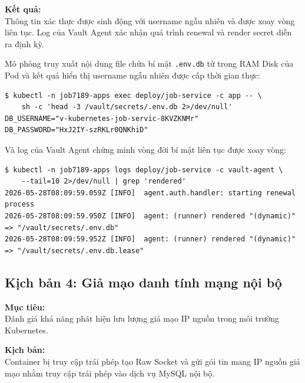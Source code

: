 \textbf{Kết quả:}\\
Thông tin xác thực được sinh động với username ngẫu nhiên và được xoay vòng liên tục. Log của Vault Agent xác nhận quá trình renewal và render secret diễn ra định kỳ.


Mô phỏng truy xuất nội dung file chứa bí mật \texttt{.env.db} từ trong RAM Disk của Pod và kết quả hiển thị username ngẫu nhiên được cấp thời gian thực:
\begin{listing}[H]
\begin{verbatim}
$ kubectl -n job7189-apps exec deploy/job-service -c app -- \
    sh -c 'head -3 /vault/secrets/.env.db 2>/dev/null'
DB_USERNAME="v-kubernetes-job-servic-8KVZKNMr"
DB_PASSWORD="HxJ2IY-szRKLr0QNKhiD"
\end{verbatim}
\caption{Đọc file mật khẩu được sinh động}
\label{lst:kb3_vault_jit_cmd}
\end{listing}

Và log của Vault Agent chứng minh vòng đời bí mật liên tục được xoay vòng:
\begin{listing}[H]
\begin{verbatim}
$ kubectl -n job7189-apps logs deploy/job-service -c vault-agent \
    --tail=10 2>/dev/null | grep 'rendered'
2026-05-28T08:09:59.059Z [INFO]  agent.auth.handler: starting renewal process
2026-05-28T08:09:59.950Z [INFO]  agent: (runner) rendered "(dynamic)" => "/vault/secrets/.env.db"
2026-05-28T08:09:59.952Z [INFO]  agent: (runner) rendered "(dynamic)" => "/vault/secrets/.env.db.lease"
\end{verbatim}
\caption{Lệnh lấy nhật ký hoạt động của tiến trình Vault Agent và kết quả}
\label{lst:kb3_vault_renew}
\end{listing}


\subsection{Kịch bản 4: Giả mạo danh tính mạng nội bộ}
\label{subsec:kb4_identity_spoofing}

\textbf{Mục tiêu:}\\
Đánh giá khả năng phát hiện lưu lượng giả mạo IP nguồn trong môi trường Kubernetes.

\textbf{Kịch bản:}\\
Container bị truy cập trái phép tạo Raw Socket và gửi gói tin mang IP nguồn giả mạo nhằm truy cập trái phép vào dịch vụ MySQL nội bộ.

